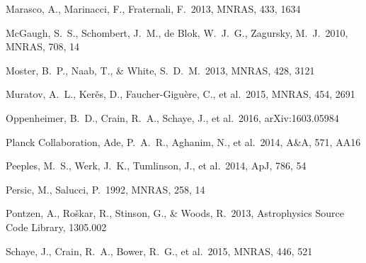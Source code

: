 \documentclass[useAMS,usenatbib]{mn2e}
\def \apj {ApJ}
\def \mnras {MNRAS}
\def \aap {A\&A}
\begin{document}
\begin{thebibliography}{}
  



Marasco, A., Marinacci, F., Fraternali, F.\ 2013, \mnras, 433, 1634

 McGaugh, S.~S., 
Schombert, J.~M., de Blok, W.~J.~G., Zagursky, M.~J.\ 2010, \mnras,
708, 14

 Moster, B.~P., Naab, T., 
\& White, S.~D.~M.\ 2013, \mnras, 428, 3121 

 Muratov, A.~L., Ker{\v e}s, D., Faucher-Gigu{\`e}re, C., et al.\ 2015, \mnras, 454, 2691




%
 Oppenheimer, B.~D., Crain, R.~A., Schaye, J., et al.\ 2016, arXiv:1603.05984


  Planck Collaboration, Ade, P.~A.~R., Aghanim, N., et al.\ 2014,
  \aap, 571, AA16 
 
 Peeples, M.~S., Werk, J.~K., Tumlinson, J., et al.\ 2014, \apj, 786, 54

 Persic, M., Salucci, P.\ 1992, \mnras, 258, 14

 Pontzen, A., Ro{\v s}kar, R., Stinson, G., \& Woods, R.\ 2013, Astrophysics Source Code Library, 1305.002 





 Schaye, J., Crain,
  R.~A., Bower, R.~G., et al.\ 2015, \mnras, 446, 521


\end{thebibliography}
\end{document}
